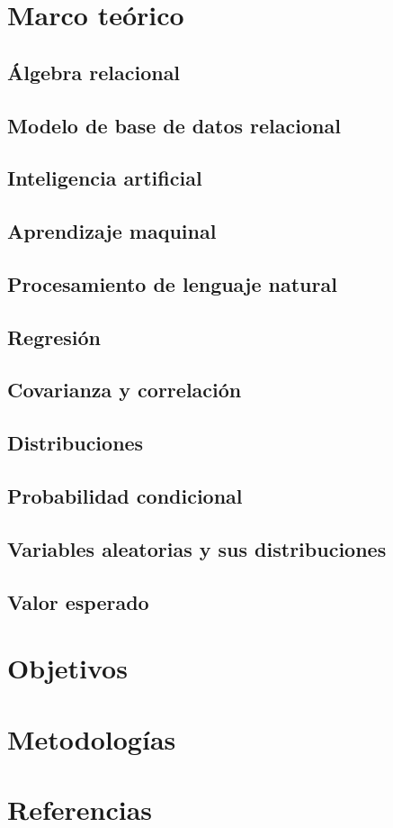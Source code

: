 \documentclass[12pt,letterpaper]{article}
\begin{document}
%
\tableofcontents
\pagebreak
\section {Marco teórico}\label{sec:marcot}
\subsection {Álgebra relacional}\label{subsec:algebra}
\subsection {Modelo de base de datos relacional}\label{subsch:rdb}
\subsection {Inteligencia artificial}\label{subsec:intela}
\subsection {Aprendizaje maquinal}\label{subsec:machinel}
\subsection {Procesamiento de lenguaje natural}\label{subsec:nlp}
\subsection {Regresión}\label{subsec:reg}%
\subsection {Covarianza y correlación}\label{subsec:reg1}
\subsection {Distribuciones}\label{subsec:dist}
\subsection {Probabilidad condicional}\label{subsec:pcond}
\subsection {Variables aleatorias y sus distribuciones}\label{subsec:vayd}
\subsection {Valor esperado}\label{subsec:valesp}
\section {Objetivos}\label{sec:objetivos}
\section {Metodologías}\label{sec:metod}
\section {Referencias}
\label{sec:refs}
\printbibliography[heading=none]
\end{document}
